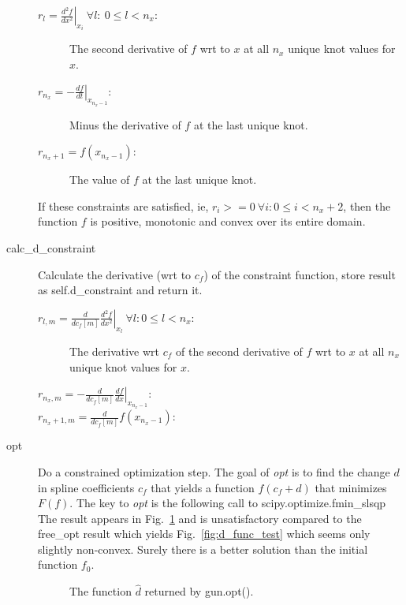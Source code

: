 \documentclass[11pt]{article}
\newcommand\cf{c_f}
\begin{document}
\begin{description}
  \begin{description}
  \item[$r_{l} = \left. \frac{d^2 f}{d x^2} \right|_{x_i}~\forall l:~
    0 \leq l < n_x$:]
    The second derivative of $f$ wrt to $x$ at all $n_x$ unique knot
    values for $x$.
  \item[$r_{n_x} = - \left. \frac{d f}{d t} \right|_{x_{n_{x}-1}}$:]
    Minus the derivative of $f$ at the last unique knot.
  \item[$r_{n_x+1} = f(x_{n_{x}-1})$:] The value of $f$ at the last
    unique knot.
  \end{description}
  If these constraints are satisfied, ie,
  $r_i>=0~\forall i: 0 \leq i<n_x+2$, then the function $f$ is
  positive, monotonic and convex over its entire domain.
\item[calc\_d\_constraint] Calculate the derivative (wrt to $\cf$) of
  the constraint function, store result as self.d\_constraint and
  return it.
  \begin{description}
  \item[$r_{l,m} = \frac{d}{d \cf[m]} \left. \frac{d^2 f}{d x^2}
    \right|_{x_l}~\forall l: 0 \leq l < n_x$:]
    The derivative wrt $\cf$ of the second derivative of $f$ wrt to
    $x$ at all $n_x$ unique knot values for $x$.
\item[$r_{n_x,m} = - \frac{d}{d \cf[m]} \left. \frac{d f}{d x}
    \right|_{x_{n_{x}-1}}$:]
  \item[$r_{n_x+1,m} = \frac{d}{d \cf[m]} f(x_{n_{x}-1})$:]
  \end{description}
\item[opt] Do a constrained optimization step.  The goal of \emph{opt}
  is to find the change $d$ in spline coefficients $c_f$ that yields a
  function $f(c_f+d)$ that minimizes $F(f)$.  The key to \emph{opt} is
  the following call to scipy.optimize.fmin\_slsqp
   The result appears in
  Fig.~\ref{fig:opt_result} and is unsatisfactory compared to the
  free\_opt result which yields Fig.~\ref{fig:d_func_test} which seems
  only slightly non-convex.  Surely there is a better solution than
  the initial function $f_0$.
  \begin{figure}
    \centering
    \caption{The function $\hat d$ returned by gun.opt().}
    \label{fig:opt_result}
  \end{figure}
\end{description}
\end{document}
